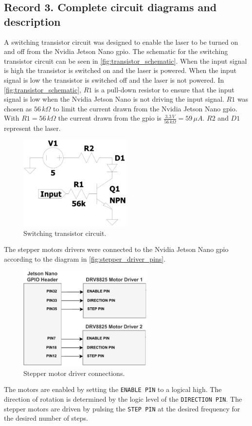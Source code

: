 \newpage
\subsection{Record 3. Complete circuit diagrams and description}
A switching transistor circuit was designed to enable the laser to be turned on and off from the Nvidia Jetson Nano \gls{gpio}. The schematic for the switching transistor circuit can be seen in \autoref{fig:transistor_schematic}.  When the input signal is high the transistor is switched on and the laser is powered. When the input signal is low the transistor is switched off and the laser is not powered. In \autoref{fig:transistor_schematic}, $R1$ is a pull-down resistor to ensure that the input signal is low when the Nvidia Jetson Nano is not driving the input signal. $R1$ was chosen as $56\,k\Omega$ to limit the current drawn from the Nvidia Jetson Nano \gls{gpio}. With $R1 = 56\,k\Omega$ the current drawn from the \gls{gpio} is $\frac{3.3\,V}{56\,k\Omega} = 59\,\mu A$. $R2$ and $D1$ represent the laser.
\begin{figure}[h]
  \centering
  \includegraphics[width=0.5\textwidth]{figures/hardware_design/laser_transistor_schematic.pdf}
  \caption{Switching transistor circuit.}
  \label{fig:transistor_schematic}
\end{figure}

The stepper motors drivers were connected to the Nvidia Jetson Nano \gls{gpio} according to the diagram in \autoref{fig:stepper_driver_pins}.
\begin{figure}[h]
  \centering
  \includegraphics[width=0.6\textwidth]{figures/stepper_driver_pins.pdf}
  \caption{Stepper motor driver connections.}
  \label{fig:stepper_driver_pins}
\end{figure}
The motors are enabled by setting the \texttt{ENABLE PIN} to a logical high. The direction of rotation is determined by the logic level of the \texttt{DIRECTION PIN}. The stepper motors are driven by pulsing the \texttt{STEP PIN} at the desired frequency for the desired number of steps.


